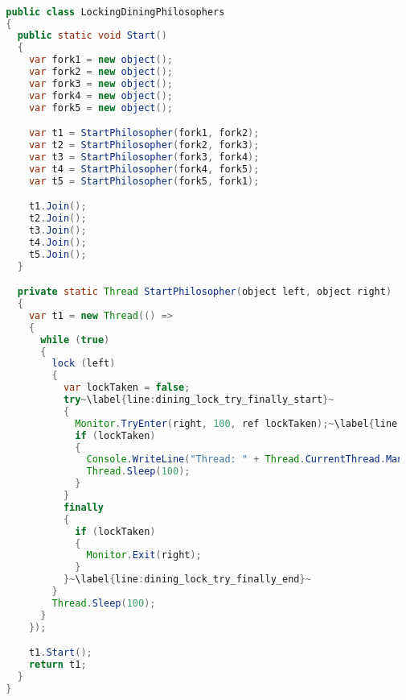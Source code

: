 \begin{lstlisting}[label=lst:impl_dining_lock,
  caption={Lock Based Dining Philosophers Implementation},
  language=Java,  
  showspaces=false,
  showtabs=false,
  breaklines=true,
  showstringspaces=false,
  breakatwhitespace=true,
  commentstyle=\color{greencomments},
  keywordstyle=\color{bluekeywords},
  stringstyle=\color{redstrings},
  escapechar=~,
  morekeywords={atomic, retry, orelse, var, get, set, ref, out, readonly, virtual, override, lock}]  % Start your code-block

  public class LockingDiningPhilosophers
  {
  	public static void Start()
  	{
      var fork1 = new object();
      var fork2 = new object();
      var fork3 = new object();
      var fork4 = new object();
      var fork5 = new object();

      var t1 = StartPhilosopher(fork1, fork2);
      var t2 = StartPhilosopher(fork2, fork3);
      var t3 = StartPhilosopher(fork3, fork4);
      var t4 = StartPhilosopher(fork4, fork5);
      var t5 = StartPhilosopher(fork5, fork1);

      t1.Join();
      t2.Join();
      t3.Join();
      t4.Join();
      t5.Join();
    }

    private static Thread StartPhilosopher(object left, object right)
    {
      var t1 = new Thread(() =>
      {
        while (true)
        {
          lock (left)
          {
            var lockTaken = false;
            try~\label{line:dining_lock_try_finally_start}~
            {
              Monitor.TryEnter(right, 100, ref lockTaken);~\label{line:dining_lock_try}~
              if (lockTaken)
              {
                Console.WriteLine("Thread: " + Thread.CurrentThread.ManagedThreadId + " eating.");
                Thread.Sleep(100);
              }
            }
            finally
            {
              if (lockTaken)
              {
                Monitor.Exit(right);
              }
            }~\label{line:dining_lock_try_finally_end}~
          }
          Thread.Sleep(100);
        }
      });

      t1.Start();
      return t1;
    }
  }
  
\end{lstlisting}

